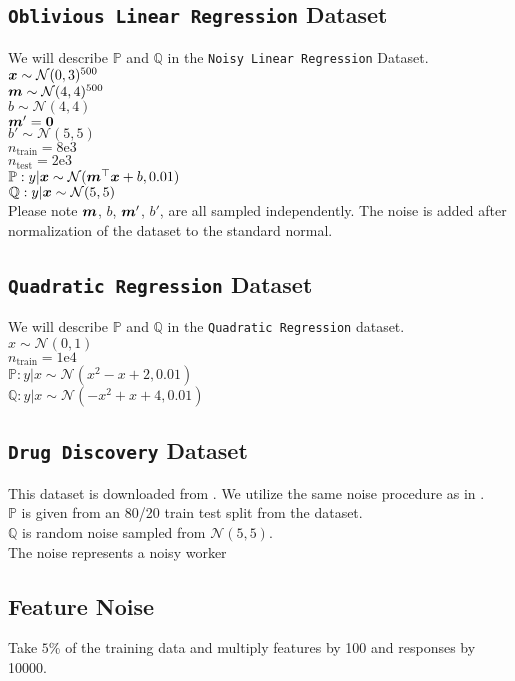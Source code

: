 \documentclass{article} %
\begin{document}
\begin{appendices}
	\subsection{\texttt{Oblivious Linear Regression} Dataset}
	We will describe $\mathbb{P}$ and $\mathbb{Q}$ in the \texttt{Noisy Linear Regression} Dataset.\\
	${\bm{x}} \sim \mathcal{N}(0,3)^{500}$\\
	${\bm{m}} \sim \mathcal{N}(4,4)^{500}$\\
	$b \sim \mathcal{N}(4,4)$\\
	${\bm{m}}' = {\bm{0}}$\\
	$b' \sim \mathcal{N}(5,5)$\\
	$n_{\text{train}} = 8\text{e}3$\\
	$n_{\text{test}} = 2\text{e}3$\\
	$\mathbb{P}: y|{\bm{x}} \sim \mathcal{N}({\bm{m}}^\top{\bm{x}} + b, 0.01)$\\
	$\mathbb{Q}: y|{\bm{x}} \sim \mathcal{N}(5,5)$\\
	Please note ${\bm{m}}$, $b$, ${\bm{m}}'$, $b'$, are all sampled independently. The noise is added after normalization of the dataset to the standard normal. 
	
	\subsection{\texttt{Quadratic Regression} Dataset}
	We will describe $\mathbb{P}$ and $\mathbb{Q}$ in the \texttt{Quadratic Regression} dataset.\\
	$x \sim \mathcal{N}(0,1)$\\
	$n_{\text{train}} = 1\text{e}4$\\
	$\mathbb{P}: y|x \sim \mathcal{N}(x^2 - x + 2, 0.01)$\\
	$\mathbb{Q}: y|x \sim \mathcal{N}(-x^2 + x + 4, 0.01)$
	
	\subsection{\texttt{Drug Discovery} Dataset}
	This dataset is downloaded from \cite{DiakonikolasKKLSS19}. We utilize the same noise procedure as in \cite{li2020tilted}.\\
	$\mathbb{P}$ is given from an 80/20 train test split from the dataset. \\
	$\mathbb{Q}$ is random noise sampled from $\mathcal{N}(5,5)$.\\
	The noise represents a noisy worker
		
	\subsection{Feature Noise}
	Take $5$\% of the training data and multiply features by 100 and responses by 10000. 
	
	\end{appendices}
\end{document}
